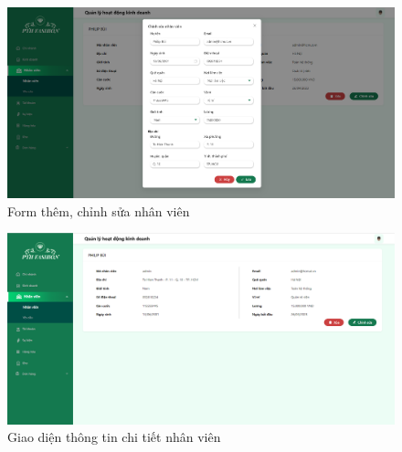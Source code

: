 \newpage

\begin{figure}[!htp]
    \centering
    \includegraphics[width=12cm]{img/UI/admin_implement/staffEdit.png}
    \newline
    \caption{Form thêm, chỉnh sửa nhân viên}
\end{figure}


\begin{figure}[!htp]
    \centering
    \includegraphics[width=12cm]{img/UI/admin_implement/staffDetail.png}
    \newline
    \caption{Giao diện thông tin chi tiết nhân viên}
\end{figure}


\newpage

